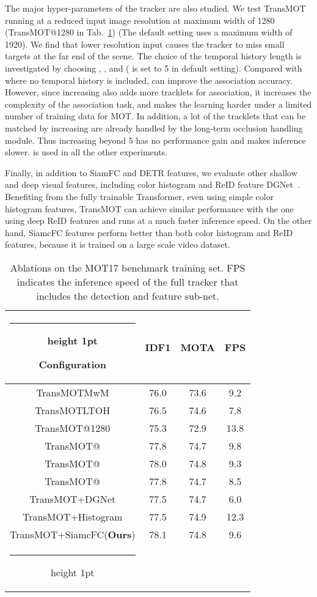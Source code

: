 \documentclass[10pt,twocolumn,letterpaper]{article}
\makeatletter
\newcommand{\thickhline}{\noalign {\ifnum 0=`}\fi \hrule height 1pt
    \futurelet \reserved@a \@xhline
}
\makeatother
\begin{document}
The major hyper-parameters of the tracker are also studied. 
We test TransMOT running at a reduced input image resolution at maximum width of 1280 (TransMOT@1280 in Tab.~\ref{table:ab}) (The default setting uses a maximum width of 1920).
We find that lower resolution input causes the tracker to miss small targets at the far end of the scene.
  The choice of the temporal history length  is investigated by choosing , , and  ( is set to 5 in default setting). 
  Compared with  where no temporal history is included,  can improve the association accuracy. 
  However, since increasing  also adds more tracklets for association, it increases the complexity of the association task, and makes the learning harder under a limited number of training data for MOT. In addition, a lot of the tracklets that can be matched by increasing  are already handled by the long-term occlusion handling module. Thus increasing  beyond 5 has no performance gain and makes inference slower. 
   is used in all the other experiments.  

Finally, in addition to SiamFC and DETR features, we evaluate other shallow and deep visual features, including color histogram and ReID feature DGNet~\cite{zheng2019joint}.
Benefiting from the fully trainable Transformer, even using simple color histogram features, TransMOT can achieve similar performance with the one using deep ReID features and runs at a much faster inference speed. On the other hand, SiamcFC features perform better than both color histogram and ReID features, because it is trained on a large scale video dataset.


\begin{table}
	\footnotesize
	\begin{center}

		
		\begin{tabular}{c@{\hskip 3.1mm}|@{\hskip 3.5mm}c@{\hskip 3.5mm}c@{\hskip 3.5mm}c@{\hskip 3.5mm}}
			\hline\thickhline
			 Configuration  & IDF1 & MOTA & FPS   \\
			 \hline
			 TransMOTMwM &  76.0 &  73.6 & 9.2\\
			 TransMOTLTOH &  76.5 & 74.6  & 7.8\\
			 \hline
			 TransMOT@1280 & 75.3& 72.9 &  13.8\\
			 \hline
			 TransMOT@ & 77.8& 74.7 & 9.8\\
			 TransMOT@ & 78.0& 74.8 & 9.3\\
			 TransMOT@ & 77.8& 74.7& 8.5\\
 			\hline
 			TransMOT+DGNet & 77.5& 74.7 & 6.0\\
            TransMOT+Histogram & 77.5 & 74.9 &  12.3 \\
			TransMOT+SiamcFC(\textbf{Ours}) & 78.1&74.8 &  9.6\\
			\hline\thickhline
		\end{tabular}

	\end{center}
	\caption{Ablations on the MOT17 benchmark training set. FPS indicates the inference speed of the full tracker that includes the detection and feature sub-net. }
    \label{table:ab}
\end{table}
\end{document}
